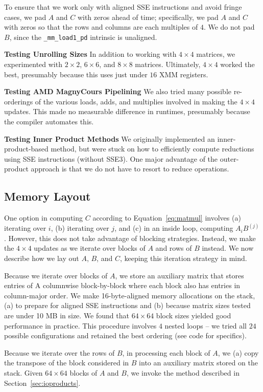 \documentclass{article} %
\begin{document}
To ensure that we work only with aligned SSE instructions and avoid fringe
cases, we pad $A$ and $C$ with zeros ahead of time; specifically, we pad
$A$ and $C$ with zeros so that the rows and columns are each multiples of $4$.
We do not pad $B$, since the \texttt{\_mm\_load1\_pd} intrinsic is unaligned.

\textbf{Testing Unrolling Sizes} In addition to working with $4\times 4$ matrices, we
experimented with $2\times 2$, $6\times 6$, and $8\times 8$ matrices.
Ultimately, $4\times 4$ worked the best, presumably because this uses just under
$16$ XMM registers.

\textbf{Testing AMD MagnyCours Pipelining} We also tried many possible
re-orderings of the various loads, adds, and multiplies involved in making the
$4\times 4$ updates. This made no measurable difference in runtimes, presumably
because the compiler automates this.

\textbf{Testing Inner Product Methods} We originally implemented an
inner-product-based method, but were stuck on how to efficiently compute
reductions using SSE instructions (without SSE3). One major advantage of the
outer-product approach is that we do not have to resort to reduce operations.

\subsection{Memory Layout}
One option in computing $C$ according to Equation~\eqref{eq:matmul} involves
(a) iterating over $i$, (b) iterating over $j$, and (c) in an inside loop,
computing $A_i B^{(j)}$. However, this does not take advantage of blocking
strategies. Instead, we make the $4\times 4$ updates as we iterate
over blocks of $A$ and rows of $B$ instead. We now describe how we lay out $A$,
$B$, and $C$, keeping this iteration strategy in mind.

Because we iterate over blocks of $A$, we store an
auxiliary matrix that stores entries of A columnwise block-by-block where each
block also has entries in column-major order. We make 16-byte-aligned memory
allocations on the stack, (a) to prepare for aligned SSE instructions and (b)
because matrix sizes tested are under 10 MB in size. We found that $64\times 64$
block sizes yielded good performance in practice. This procedure involves $4$
nested loops -- we tried all $24$ possible configurations and retained the best
ordering (see code for specifics).

Because we iterate over the rows of $B$, in processing
each block of $A$, we (a) copy the transpose of the block considered in $B$ into
an auxiliary matrix stored on the stack. Given $64\times 64$ blocks of $A$ and
$B$, we invoke the method described in Section~\ref{sec:ioproducts}.
\end{document}
